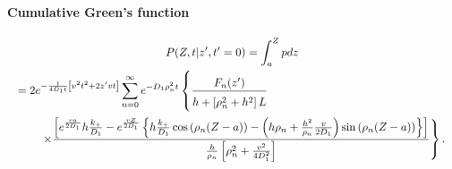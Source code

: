 \paragraph{Cumulative Green's function}
\begin{multline}
 P(Z,t|z',t'=0) = \int_a^Z pdz \\
 \shoveleft{
  = 2e^{-\frac{1}{4D_1t}\left[ v^2t^2 + 2z'vt \right]}
    \sum_{n=0}^{\infty} e^{-D_1\rn^2t} \left\lbrace \frac{F_n(z')}{\Big. h + \left[\rn^2 + h^2\right]L \Big.} \right.
 } \\
 \shoveright{
    \quad\quad\quad \left.\times
    \frac{
    \left[
	  e^{\frac{va}{2D_1}} h\frac{k_+}{D_1}
	- e^{\frac{vZ}{2D_1}}
	    \left\lbrace
	       h\frac{k_+}{D_1}\cos\left(\rn(Z-a)\right) - \left(h\rn + \frac{h^2}{\rn}\frac{v}{2D_1}\right)\sin\left(\rn(Z-a)\right)
	    \right\rbrace
    \right]
    }
    {\frac{h}{\rn}\left[ \rn^2 + \frac{v^2}{4 D_1^2} \right]}
    \right\rbrace .
 }
\end{multline}
